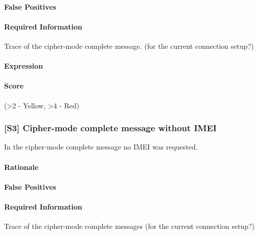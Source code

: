 \documentclass[a4paper,11pt,notitlepage,bigheadings,oneside]{scrartcl}
\begin{document}
\paragraph{False Positives}

\TBD

\paragraph{Required Information}

Trace of the cipher-mode complete message. (for the current connection setup?)

\paragraph{Expression}

\TBD

\paragraph{Score}

\TBD{} (\textgreater 2 - Yellow, \textgreater 4 - Red)


\subsubsection{[S3] Cipher-mode complete message without IMEI}

In the cipher-mode complete message no IMEI was requested.

\paragraph{Rationale}

\TBD

\paragraph{False Positives}

\TBD


\paragraph{Required Information}

\TBD

Trace of the cipher-mode complete messages (for the current connection setup?)
\end{document}
